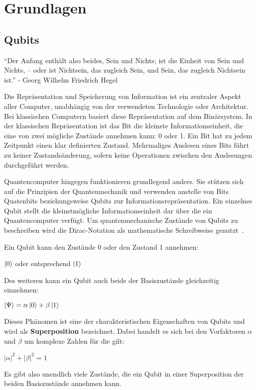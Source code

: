 \section{Grundlagen}
\subsection{Qubits} 
"`Der Anfang enthält also beides, Sein und
Nichts; ist die Einheit von Sein und Nichts,
– oder ist Nichtsein, das zugleich Sein, und
Sein, das zugleich Nichtsein ist."'
- Georg Wilhelm Friedrich Hegel

Die Repräsentation und Speicherung von Information ist ein zentraler Aspekt aller Computer, 
unabhängig von der verwendeten Technologie oder Architektur. 
Bei klassischen Computern basiert diese Repräsentation auf dem Binärsystem. 
In der klassischen Repräsentation ist das Bit die kleinste Informationseinheit, 
die eine von zwei mögliche Zustände annehmen kann: 0 oder 1. 
Ein Bit hat zu jedem Zeitpunkt einen klar definierten Zustand. 
Mehrmaliges Auslesen eines Bits führt zu keiner Zustandsänderung, 
sofern keine Operationen zwischen den Auslesungen durchgeführt werden.

Quantencomputer hingegen funktionieren grundlegend anders. 
Sie stützen sich auf die Prinzipien der Quantenmechanik und verwenden anstelle von Bits Quatenbits beziehungsweise Qubits zur Informationsrepräsentation.
Ein einzelnes Qubit stellt die kleinstmögliche Informationseinheit dar über die ein Quantencomputer verfügt.
Um quantenmechanische Zustände von Qubits zu beschreiben wird die Dirac-Notation als mathematische Schreibweise genutzt~\cite{dirac_1939}.

Ein Qubit kann den Zustände 0 oder den Zustand 1 annehmen:
\begin{center}
\(\ket{0}\) oder entsprechend \(\ket{1}\)
\end{center}

Des weiteren kann ein Qubit auch beide der Basiszustände gleichzeitig einnehmen:
\begin{center}
\(\ket{\Psi} = \alpha\ket{0} + \beta\ket{1}\)
\end{center}
Dieses Phänomen ist eine der charakteristischen Eigenschaften von Qubits und wird als \textbf{Superposition} bezeichnet.
Dabei handelt es sich bei den Vorfaktoren \(\alpha\) und \(\beta\) um komplexe Zahlen für die gilt:
\begin{center}
\(\lvert\alpha\rvert^2 + \lvert\beta\rvert^2 = 1\)
\end{center}
Es gibt also unendlich viele Zustände, die ein Qubit in einer Superposition der beiden Basiszustände annehmen kann.

